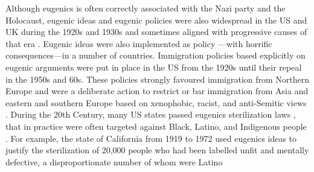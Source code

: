 Although eugenics is often correctly associated with the Nazi party and the Holocaust, eugenic ideas and eugenic policies were also widespread in the US and UK during the 1920s and 1930s and sometimes aligned with progressive causes of that era \citep{paul1984eugenics,kevles1995name}. Eugenic ideas were also implemented as policy ---with horrific consequences---in a number of countries. Immigration policies based explicitly on eugenic arguments were put in place in the US from the 1920s until their repeal in the 1950s and 60s. These policies strongly favoured immigration from Northern Europe and were a deliberate action to restrict or bar immigration from Asia and eastern and southern Europe based on xenophobic, racist, and anti-Semitic views \citep{okrent2020guarded}. During the 20th Century, many US states passed eugenics sterilization laws  \citep{reilly2015eugenics}, that in practice were often targeted against Black, Latino, and Indigenous people \citep{hansen2013sterilized}. For example, the state of California from 1919 to 1972 used eugenics ideas to justify the sterilization of 20,000 people who had been labelled unfit and mentally defective, a disproportionate number of whom were Latino \citep{stern2017california,novak2018disproportionate} 
 


